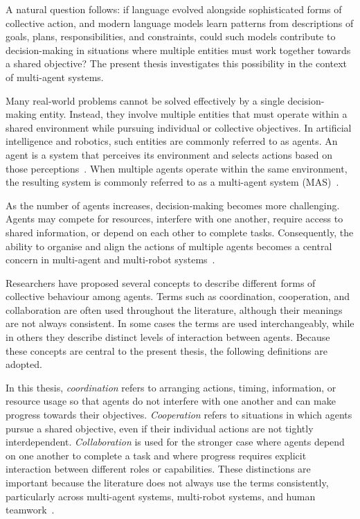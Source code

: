 A natural question follows: if language evolved alongside sophisticated forms of collective action, and modern language models learn patterns from descriptions of goals, plans, responsibilities, and constraints, could such models contribute to decision-making in situations where multiple entities must work together towards a shared objective? The present thesis investigates this possibility in the context of multi-agent systems.

Many real-world problems cannot be solved effectively by a single decision-making entity. Instead, they involve multiple entities that must operate within a shared environment while pursuing individual or collective objectives. In artificial intelligence and robotics, such entities are commonly referred to as agents. An agent is a system that perceives its environment and selects actions based on those perceptions~\cite{russell2021}. When multiple agents operate within the same environment, the resulting system is commonly referred to as a multi-agent system (MAS)~\cite{wooldridge2009}.

As the number of agents increases, decision-making becomes more challenging. Agents may compete for resources, interfere with one another, require access to shared information, or depend on each other to complete tasks. Consequently, the ability to organise and align the actions of multiple agents becomes a central concern in multi-agent and multi-robot systems~\cite{yan2013mrscoordination}.

Researchers have proposed several concepts to describe different forms of collective behaviour among agents. Terms such as coordination, cooperation, and collaboration are often used throughout the literature, although their meanings are not always consistent. In some cases the terms are used interchangeably, while in others they describe distinct levels of interaction between agents. Because these concepts are central to the present thesis, the following definitions are adopted.

In this thesis, \emph{coordination} refers to arranging actions, timing, information, or resource usage so that agents do not interfere with one another and can make progress towards their objectives. \emph{Cooperation} refers to situations in which agents pursue a shared objective, even if their individual actions are not tightly interdependent. \emph{Collaboration} is used for the stronger case where agents depend on one another to complete a task and where progress requires explicit interaction between different roles or capabilities. These distinctions are important because the literature does not always use the terms consistently, particularly across multi-agent systems, multi-robot systems, and human teamwork~\cite{yan2013mrscoordination}.

